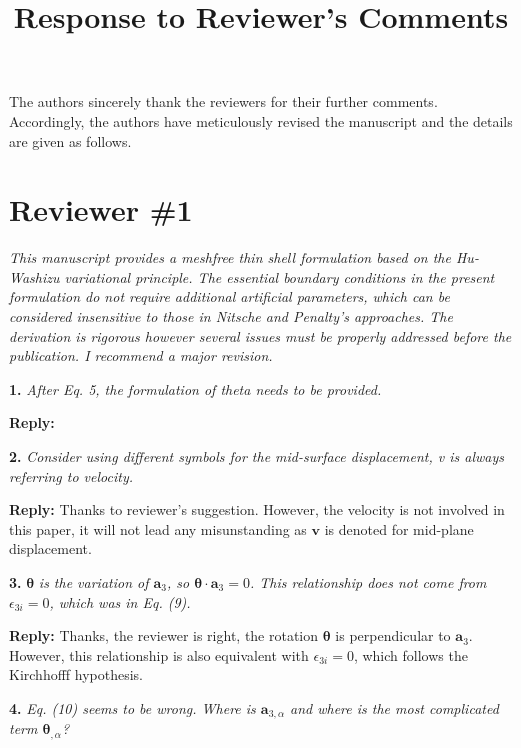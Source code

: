 \documentclass{article}
\title{Response to Reviewer's Comments}
\begin{document}
\maketitle

The authors sincerely thank the reviewers for their further comments. Accordingly, the authors have meticulously revised the manuscript and the details are given as follows.

\section*{Reviewer \#1}
\textit{This manuscript provides a meshfree thin shell formulation based on the Hu-Washizu variational principle. The essential boundary conditions in the present formulation do not require additional artificial parameters, which can be considered insensitive to those in Nitsche and Penalty’s approaches. The derivation is rigorous however several issues must be properly addressed before the publication. I recommend a major revision.}

\textbf{1.} \textit{After Eq. 5, the formulation of theta needs to be provided.}

\textbf{Reply:}

\textbf{2.} \textit{Consider using different symbols for the mid-surface displacement, v is always referring to velocity.}

\textbf{Reply:} Thanks to reviewer's suggestion. However, the velocity is not involved in this paper, it will not lead any misunstanding as $\boldsymbol v$ is denoted for mid-plane displacement.

\textbf{3.} $\boldsymbol \theta$ \textit{is the variation of $\boldsymbol a_3$, so $\boldsymbol \theta \cdot \boldsymbol a_3=0$. This relationship does not come from $\epsilon_{3i} = 0$, which was in Eq. (9).}

\textbf{Reply:} Thanks, the reviewer is right, the rotation $\boldsymbol \theta$ is perpendicular to $\boldsymbol a_3$. However, this relationship is also equivalent with $\epsilon_{3i}=0$, which follows the Kirchhofff hypothesis.

\textbf{4.} \textit{Eq. (10) seems to be wrong. Where is $\boldsymbol a_{3,\alpha}$ and where is the most complicated term $\boldsymbol \theta_{,\alpha}$?}
\end{document}
